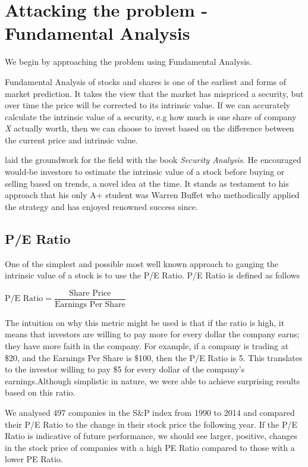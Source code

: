 \documentclass{report}
\begin{document}
\section{Attacking the problem - Fundamental Analysis}

We begin by approaching the problem using Fundamental Analysis. 

Fundamental Analysis of stocks and shares is one of the earliest and forms of market prediction. It takes the view that the market has mispriced a security, but over time the price will be corrected to its intrinsic value. If we can accurately calculate the intrinsic value of a security, e.g how much is one share of company \textit{X} actually worth, then we can choose to invest based on the difference between the current price and intrinsic value. 

\citet{graham1934security} laid the groundwork for the field with the book \textit{Security Analysis}. He encouraged would-be investors to estimate the intrinsic value of a stock before buying or selling based on trends, a novel idea at the time. It stands as testament to his approach that his only A+ student was Warren Buffet who methodically applied the strategy and has enjoyed renowned success since. \cite{schroeder2008snowball}

\subsection{P/E Ratio}

One of the simplest and possible most well known approach to gauging the intrinsic value of a stock is to use the P/E Ratio. P/E Ratio is defined as follows

\begin{math}
	\text{P/E Ratio} = \dfrac{\text{Share Price}}{\text{Earnings Per Share}}
\end{math}

The intuition on why this metric might be used is that if the ratio is high, it means that investors are willing to pay more for every dollar the company earns; they have more faith in the company. For example, if a company is trading at \$20, and the Earnings Per Share is \$100, then the P/E Ratio is 5. This translates to the investor willing to pay \$5 for every dollar of the company's earnings.Although simplistic in nature, we were able to achieve surprising results based on this ratio. 

We analysed 497 companies in the S{\&}P index from 1990 to 2014 and compared their P/E Ratio to the change in their stock price the following year. If the P/E Ratio is indicative of future performance, we should see larger, positive, changes in the stock price of companies with a high PE Ratio compared to those with a lower PE Ratio.
\end{document}
